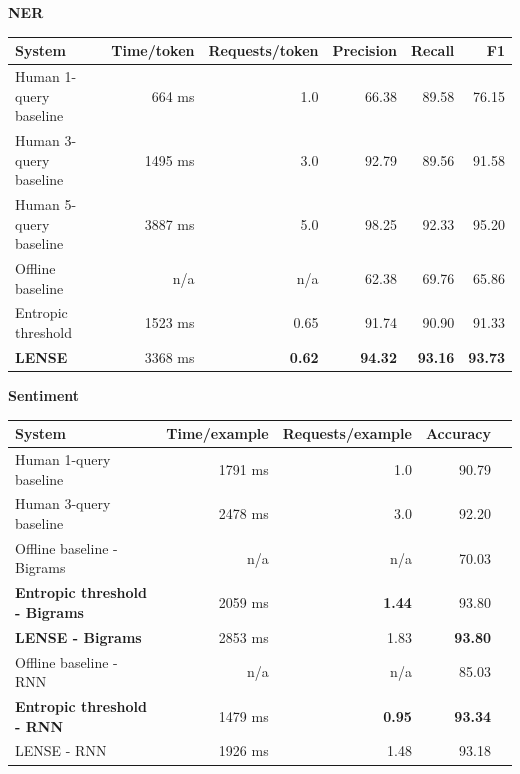 \begin{table}[ht]
{\bf NER} \\
\begin{tabular}{l r r r r r}
    \textbf{System} & \textbf{Time/token} & \textbf{Requests/token} & \textbf{Precision} & \textbf{Recall} & \textbf{F1} \\ \hline
    Human 1-query baseline & 664 ms & 1.0 & 66.38 & 89.58 & 76.15 \\ %
    Human 3-query baseline & 1495 ms & 3.0 & 92.79 & 89.56 & 91.58 \\ %
    Human 5-query baseline & 3887 ms & 5.0 & 98.25 & 92.33 & 95.20 \\ %
    Offline baseline & n/a & n/a & 62.38 & 69.76 & 65.86 \\ %
    Entropic threshold & 1523 ms & 0.65 & 91.74 & 90.90 & 91.33 \\ %
    \textbf{LENSE} & 3368 ms & \textbf{0.62} & \textbf{94.32} & \textbf{93.16} & \textbf{93.73} \\ %
\end{tabular}

{\bf Sentiment}\\
\begin{tabular}{l  r  r  r  r}
    \textbf{System} & \textbf{Time/example} & \textbf{Requests/example} & \textbf{Accuracy} \\ \hline
    Human 1-query baseline & 1791 ms & 1.0 & 90.79 \\ %
    Human 3-query baseline & 2478 ms & 3.0 & 92.20 \\ %
    Offline baseline - Bigrams & n/a & n/a & 70.03 \\ %
    \textbf{Entropic threshold - Bigrams} & 2059 ms & \textbf{1.44} & 93.80 \\ %
    \textbf{LENSE - Bigrams} & 2853 ms & 1.83 & \textbf{93.80} \\%
    Offline baseline - RNN & n/a & n/a & 85.03 \\ %
    \textbf{Entropic threshold - RNN} & 1479 ms & \textbf{0.95} & \textbf{93.34} \\ %
    LENSE - RNN & 1926 ms & 1.48 & 93.18 \\ %
\end{tabular}


\end{table}

